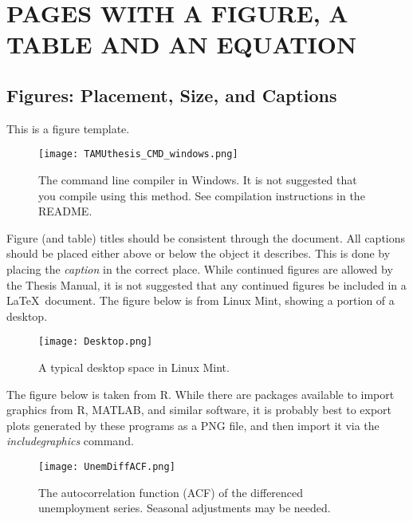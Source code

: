 %
%
%
%



\chapter{PAGES WITH A FIGURE, A TABLE AND AN EQUATION}
\section{Figures: Placement, Size, and Captions}
This is a figure template.
\begin{figure}[ht]
\centering
\texttt{[image: TAMUthesis\_CMD\_windows.png]}
\caption[The command line compiler in Windows.]{The command line compiler in Windows. It is not suggested that you compile using this method. See compilation instructions in the README.}

\label{fig:CMD_1}

\end{figure}

Figure (and table) titles should be consistent through the document. All captions should be placed either above or below the object it describes. This is done by placing the \textit{caption} in the correct place. While continued figures are allowed by the Thesis Manual, it is not suggested that any continued figures be included in a \LaTeX\ document. The figure below is from Linux Mint, showing a portion of a desktop.

\begin{figure}[H]
	\centering
	\texttt{[image: Desktop.png]}
	\caption{A typical desktop space in Linux Mint.}
\end{figure}

The figure below is taken from R. While there are packages available to import graphics from R, MATLAB, and similar software, it is probably best to export plots generated by these programs as a PNG file, and then import it via the \textit{includegraphics} command.

\begin{figure}[H]
	\centering
	\texttt{[image: UnemDiffACF.png]}
	\singlespace
	\caption{The autocorrelation function (ACF) of the differenced unemployment series. Seasonal adjustments may be needed.}
\end{figure}


